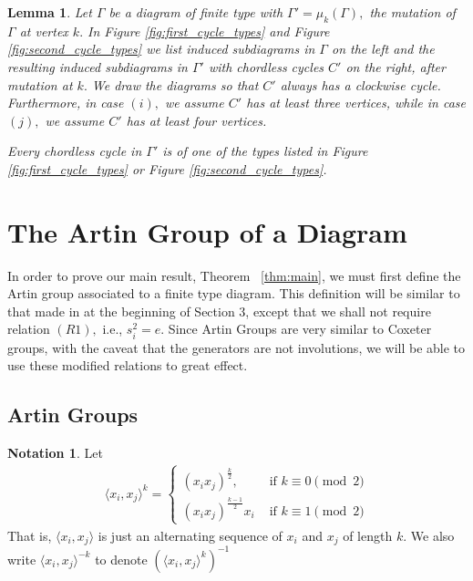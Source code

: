 \documentclass[11pt]{amsart}
\newtheorem{lem}[thm]{Lemma}
\theoremstyle{definition}
\newtheorem{note}[thm]{Notation}
\begin{document}
\begin{lem}\label{lem:chordless_cycles}
\cite[Lemma 2.5]{BM13} 
Let $\Gamma$ be a diagram of finite type with $\Gamma' = \mu_k(\Gamma),$ the mutation of $\Gamma$ at vertex $k.$ In Figure \ref{fig:first_cycle_types} and Figure \ref{fig:second_cycle_types} we list induced subdiagrams in $\Gamma$ on the left and the resulting induced subdiagrams in $\Gamma'$ with chordless cycles $C'$ on the right, after mutation at $k.$ We draw the diagrams so that $C'$ always has a clockwise cycle. Furthermore, in case $(i),$ we assume $C'$ has at least three vertices, while in case $(j),$ we assume $C'$ has at least four vertices. 

Every chordless cycle in $\Gamma'$ is of one of the types listed in Figure \ref{fig:first_cycle_types} or Figure \ref{fig:second_cycle_types}.
\end{lem}


\section{The Artin Group of a Diagram}
\label{sec:defn_artingroup}

In order to prove our main result, Theorem ~\ref{thm:main}, we must first define the Artin group associated to a finite type diagram. This definition will be similar to that made in \cite{BM13} at the beginning of Section 3, except that we shall not require relation $(R1),$ i.e., $s_i^2 = e.$ Since Artin Groups are very similar to Coxeter groups, with the caveat that the generators are not involutions, we will be able to use these modified relations to great effect.

\subsection{Artin Groups}

\begin{note}
Let
\begin{align*}
\langle x_i,x_j \rangle ^k = \begin{cases}
(x_ix_j)^{\frac{k}{2}}, &\text{ if }k \equiv 0 \pmod 2\\
(x_ix_j)^{\frac{k-1}{2}}x_i &\text{ if } k \equiv 1 \pmod 2
\end{cases}
\end{align*}
That is, $\langle x_i,x_j \rangle$ is just an alternating sequence of $x_i$ and $x_j$ of length $k$.  We also write $\langle x_i,x_j\rangle^{-k}$ to denote $\left(\langle x_i,x_j\rangle^k\right)^{-1}$
\end{note}
\end{document}
